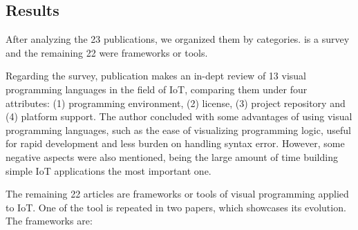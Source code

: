 \subsection{Results}\label{sec:slr_results}

After analyzing the 23 publications, we organized them by categories. \cite{survey_vpl_iot} is a survey and the remaining 22 were frameworks or tools.
\par Regarding the survey, publication \cite{survey_vpl_iot} makes an in-dept review of 13 visual programming languages in the field of IoT, comparing them under four attributes: (1) programming environment, (2) license, (3) project repository and (4) platform support. The author concluded with some advantages of using visual programming languages, such as the ease of visualizing programming logic, useful for rapid development and less burden on handling syntax error. However, some negative aspects were also mentioned, being the large amount of time building simple IoT applications the most important one.
\par The remaining 22 articles are frameworks or tools of visual programming applied to IoT. One of the tool is repeated in two papers, which showcases its evolution. The frameworks are:

